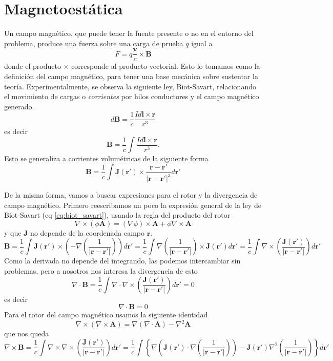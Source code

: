 ﻿\documentclass{article}
\numberwithin{equation}{section} %
\renewcommand{\vec}[1]{\boldsymbol{#1}}
\newcommand{\rinv}{\frac{1}{|\vec{r} - \vec{r}'|}}
\newcommand{\Rinv}{\frac{\vec{r} - \vec{r}'}{|\vec{r} - \vec{r}'|^3}}
\begin{document}
\section{Magnetoestática}
Un campo magnético, que puede tener la fuente presente o no en el entorno del problema, produce una fuerza sobre una carga de prueba $q$ igual a 
\begin{equation}
F = q \frac{\vec{v}}{c} \times \vec{B}
\end{equation}
donde el producto $\times$ corresponde al producto vectorial. Esto lo tomamos como la definición del campo magnético, para tener una base mecánica sobre sustentar la teoría.
Experimentalmente, se observa la siguiente ley, Biot-Savart, relacionando el movimiento de cargas o \emph{corrientes} por hilos conductores y el campo magnético generado.
\begin{equation}
 d\vec{B} = \frac{1}{c} \frac{I d\vec{l} \times \vec{r}}{r^3}
\end{equation}
es decir 
\begin{equation}
    \vec{B} = \frac{1}{c} \int  \frac{I d\vec{l} \times \vec{r}}{r^3}.
\end{equation}
Esto se generaliza a corrientes volumétricas de la siguiente forma
\begin{equation}
    \vec{B} = \frac{1}{c} \int  \vec{J}(\vec{r}') \times \Rinv d\vec{r}'
    \label{eq:biot_savart}
\end{equation}

De la misma forma, vamos a buscar expresiones para el rotor y la divergencia de campo magnético. Primero reescribamos un poco la expresión general de la ley de Biot-Savart (eq \ref{eq:biot_savart}), usando la regla del producto del rotor
\[ \nabla \times (\phi \vec{A}) = (\nabla \phi) \times \vec{A} + \phi \nabla \times \vec{A} \]
y que $\vec{J}$ no depende de la coordenada campo $\vec{r}$.
\[ \vec{B} = \frac{1}{c} \int  \vec{J}(\vec{r}') \times \left(- \nabla\left(\rinv\right) \right) d\vec{r}' = \frac{1}{c} \int  \nabla\left(\rinv\right) \times \vec{J}(\vec{r}') d\vec{r}' = \frac{1}{c} \int \nabla \times \left( \frac{\vec{J}(\vec{r}')}{|\vec{r} - \vec{r}'|}\right) d\vec{r}'\]
Como la derivada no depende del integrando, las podemos intercambiar sin problemas, pero a nosotros nos interesa la divergencia de esto
\[ \nabla \cdot \vec{B} = \frac{1}{c} \int  \nabla \cdot \nabla \times \left( \frac{\vec{J}(\vec{r}')}{|\vec{r} - \vec{r}'|}\right) d\vec{r}' = 0\]
es decir 
\begin{equation}
    \nabla \cdot \vec{B} = 0
    \label{eq:gauss_magnetic}
\end{equation}
Para el rotor del campo magnético usamos la siguiente identidad
\begin{equation}
\nabla \times \left( \nabla \times \vec{A} \right) = \nabla(\nabla \cdot \vec{A}) - \nabla^{2}\vec{A}
\end{equation}
que nos queda
\[ \nabla \times \vec{B} = \frac{1}{c} \int  \nabla \times \nabla \times \left( \frac{\vec{J}(\vec{r}')}{|\vec{r} - \vec{r}'|}\right) d\vec{r}' = \frac{1}{c} \int \left\{ \nabla  \left(\vec{J}(\vec{r}') \cdot \nabla \left( \rinv \right) \right) - \vec{J}(\vec{r}') \nabla^2 \left( \rinv \right) \right\} d\vec{r}' \]
\end{document}
